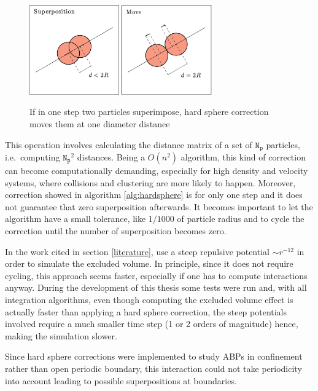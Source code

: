 \documentclass[../../master_thesis_np.tex]{subfiles}
\begin{document}
		\begin{figure}[htp]
			\centering
			\includegraphics[width = 0.7\textwidth]{callegari_volpe_2019_hardsphere.png}
			\label{fig:hardsphere}
			\caption{If in one step two particles superimpose, hard sphere correction moves them at one diameter distance \cite{callegari_numerical_2019}}
		\end{figure}

	This operation involves calculating the distance matrix of a set of $\mathtt{N_p}$ particles, i.e.\ computing $\mathtt{N_p}^2$ distances. Being a $O(n^2)$ algorithm, this kind of correction can become computationally demanding, especially for high density and velocity systems, where collisions and clustering are more likely to happen. Moreover, correction showed in algorithm \ref{alg:hardsphere} is for only one step and it does not guarantee that zero superposition afterwards. It becomes important to let the algorithm have a small tolerance, like $1/1000$ of particle radius and to cycle the correction until the number of superposition becomes zero.

	
	In the work cited in section \ref{literature}, \citeauthor{martin-gomez_collective_2018} use a steep repulsive potential $\sim r^{-12}$ in order to simulate the excluded volume. In principle, since it does not require cycling, this approach seems faster, especially if one has to compute interactions anyway. During the development of this thesis some tests were run and, with all integration algorithms, even though computing the excluded volume effect is actually faster than applying a hard sphere correction, the steep potentials involved require a much smaller time step (1 or 2 orders of magnitude) hence, making the simulation slower.
	
	Since hard sphere corrections were implemented to study ABPs in confinement rather than open periodic boundary, this interaction could not take periodicity into account leading to possible superpositions at boundaries.
	
\end{document}
